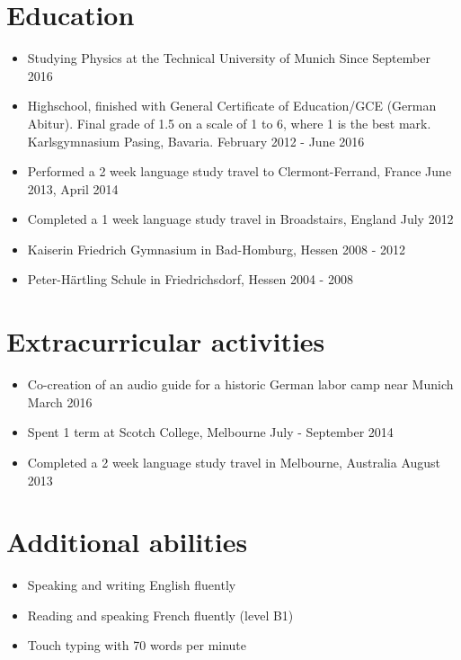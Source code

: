 \documentclass[11pt,a4paper]{article}
\begin{document}
\section*{Education}
\begin{itemize}
	\setlength{\itemsep}{1pt}
	\item[] Studying Physics at the Technical University of Munich \hfill Since September 2016
	\item[] Highschool, finished with General Certificate of Education/GCE (German Abitur).
	Final grade of 1.5 on a scale of 1 to 6, where 1 is the best mark. Karlsgymnasium Pasing, Bavaria.
	\hfill February 2012 - June 2016
	\item[] Performed a 2 week language study travel to Clermont-Ferrand, France
	\hfill June 2013, April 2014
	\item[] Completed a 1 week language study travel in Broadstairs, England \hfill July 2012
	\item[] Kaiserin Friedrich Gymnasium in Bad-Homburg, Hessen \hfill 2008 - 2012
	\item[] Peter-Härtling Schule in Friedrichsdorf, Hessen \hfill 2004 - 2008
\end{itemize}

\section*{Extracurricular activities}
\begin{itemize}
	\setlength{\itemsep}{1pt}
	\item[] Co-creation of an audio guide for a historic German labor camp near Munich
	\hfill March 2016
	\item[] Spent 1 term at Scotch College, Melbourne \hfill July - September 2014
	\item[] Completed a 2 week language study travel in Melbourne, Australia \hfill August 2013
\end{itemize}

\section*{Additional abilities}
\begin{itemize}
	\setlength{\itemsep}{1pt}
	\item Speaking and writing English fluently
	\item Reading and speaking French fluently (level B1)
	\item Touch typing with 70 words per minute
\end{itemize}
\end{document}
